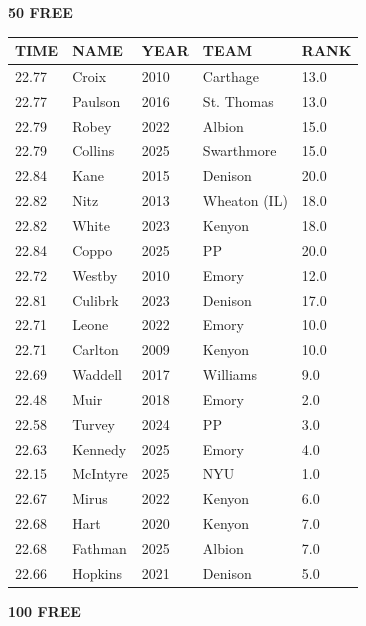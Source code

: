 \begin{table}[H]
\centering
\begin{minipage}[t]{0.48\textwidth}
\centering
\textbf{50 FREE}\\[0.1cm]
\begin{tabular}{@{}p{1.8cm}p{2.8cm}p{1.2cm}p{1.4cm}p{0.8cm}@{}}
\hline
    \textbf{TIME} & \textbf{NAME} & \textbf{YEAR} & \textbf{TEAM} & \textbf{RANK} \\
\hline
    22.77 & Croix & 2010 & Carthage & 13.0 \\
    22.77 & Paulson & 2016 & St. Thomas & 13.0 \\
    22.79 & Robey & 2022 & Albion & 15.0 \\
    22.79 & Collins & 2025 & Swarthmore & 15.0 \\
    22.84 & Kane & 2015 & Denison & 20.0 \\
    22.82 & Nitz & 2013 & Wheaton (IL) & 18.0 \\
    22.82 & White & 2023 & Kenyon & 18.0 \\
    22.84 & Coppo & 2025 & PP & 20.0 \\
    22.72 & Westby & 2010 & Emory & 12.0 \\
    22.81 & Culibrk & 2023 & Denison & 17.0 \\
    22.71 & Leone & 2022 & Emory & 10.0 \\
    22.71 & Carlton & 2009 & Kenyon & 10.0 \\
    22.69 & Waddell & 2017 & Williams & 9.0 \\
    22.48 & Muir & 2018 & Emory & 2.0 \\
    22.58 & Turvey & 2024 & PP & 3.0 \\
    22.63 & Kennedy & 2025 & Emory & 4.0 \\
    22.15 & McIntyre & 2025 & NYU & 1.0 \\
    22.67 & Mirus & 2022 & Kenyon & 6.0 \\
    22.68 & Hart & 2020 & Kenyon & 7.0 \\
    22.68 & Fathman & 2025 & Albion & 7.0 \\
    22.66 & Hopkins & 2021 & Denison & 5.0 \\
\hline
\end{tabular}
\end{minipage}\hfill
\begin{minipage}[t]{0.48\textwidth}
\centering
\textbf{100 FREE}\\[0.1cm]
\begin{tabular}{@{}p{1.8cm}p{2.8cm}p{1.2cm}p{1.4cm}p{0.8cm}@{}}

\end{tabular}
\end{minipage}
\end{table}
